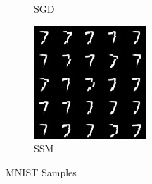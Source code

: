 \begin{figure}[htb]
\begin{subfigure}[b]{0.3\textwidth}
        \caption{SGD}
        \label{fig:sub2}
    \end{subfigure}
    \hfill
    \begin{subfigure}[b]{0.3\textwidth}
        \centering
        \includegraphics[width=\textwidth]{figures/mnist_SSM.png} %
        \caption{SSM}
        \label{fig:sub3}
    \end{subfigure}

    \caption{MNIST Samples}
    \label{fig:three_images}
\end{figure}